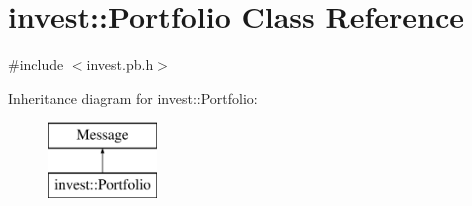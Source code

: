 \hypertarget{classinvest_1_1_portfolio}{}\section{invest\+:\+:Portfolio Class Reference}
\label{classinvest_1_1_portfolio}


{\ttfamily \#include $<$invest.\+pb.\+h$>$}

Inheritance diagram for invest\+:\+:Portfolio\+:\begin{figure}[H]
\begin{center}
\leavevmode
\includegraphics[height=2.000000cm]{classinvest_1_1_portfolio}
\end{center}
\end{figure}
